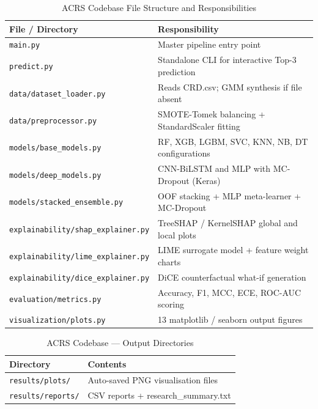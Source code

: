 \documentclass[12pt,a4paper,oneside]{report}
\begin{document}
\begin{table}[H]
\centering
\caption{ACRS Codebase File Structure and Responsibilities}
\label{tab:codebase}
\renewcommand{\arraystretch}{1.5}
\begin{tabular}{p{5.5cm} p{7.5cm}}
\toprule
\textbf{File / Directory} & \textbf{Responsibility} \\
\midrule
{\scriptsize\texttt{main.py}} & Master pipeline entry point \\
{\scriptsize\texttt{predict.py}} & Standalone CLI for interactive Top-3 prediction \\
{\scriptsize\texttt{data/dataset\_loader.py}} & Reads CRD.csv; GMM synthesis if file absent \\
{\scriptsize\texttt{data/preprocessor.py}} & SMOTE-Tomek balancing + StandardScaler fitting \\
{\scriptsize\texttt{models/base\_models.py}} & RF, XGB, LGBM, SVC, KNN, NB, DT configurations \\
{\scriptsize\texttt{models/deep\_models.py}} & CNN-BiLSTM and MLP with MC-Dropout (Keras) \\
{\scriptsize\texttt{models/stacked\_ensemble.py}} & OOF stacking + MLP meta-learner + MC-Dropout \\
{\scriptsize\texttt{explainability/shap\_explainer.py}} & TreeSHAP / KernelSHAP global and local plots \\
{\scriptsize\texttt{explainability/lime\_explainer.py}} & LIME surrogate model + feature weight charts \\
{\scriptsize\texttt{explainability/dice\_explainer.py}} & DiCE counterfactual what-if generation \\
{\scriptsize\texttt{evaluation/metrics.py}} & Accuracy, F1, MCC, ECE, ROC-AUC scoring \\
{\scriptsize\texttt{visualization/plots.py}} & 13 matplotlib / seaborn output figures \\
\bottomrule
\end{tabular}
\end{table}

\newpage

\begin{table}[H]
\centering
\caption*{ACRS Codebase --- Output Directories}
\renewcommand{\arraystretch}{1.5}
\begin{tabular}{p{5.5cm} p{7.5cm}}
\toprule
\textbf{Directory} & \textbf{Contents} \\
\midrule
{\scriptsize\texttt{results/plots/}} & Auto-saved PNG visualisation files \\
{\scriptsize\texttt{results/reports/}} & CSV reports + research\_summary.txt \\
\bottomrule
\end{tabular}
\end{table}
\end{document}
